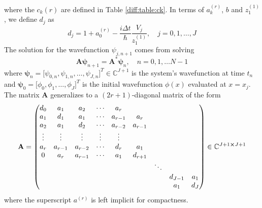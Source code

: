 \documentclass[11pt, a4paper]{article}
\newcommand{\mat}[1]{\mathbf{#1}}
\begin{document}
where the $ c_{k}(r) $ are defined in Table \ref{diff:table:ck}. In terms of $ a_{k}^{(r)} $, $ b $ and $ z_{1}^{(1)} $, we define $ d_{j} $  as
\begin{equation}
	d_{j} = 1 + a_{0}^{(r)} - \frac{i\Delta t}{\hbar}\frac{V_{j}}{z_{1}^{(1)}}, \quad j = 0, 1, \ldots, J \label{diff:eq:d}
\end{equation}
The solution for the wavefunction $ \psi_{j, n+1} $ comes from solving
\begin{equation}
	\mat{A} \bm{\psi}_{n+1} = \mat{A}^{*} \bm{\psi}_{n}, \quad n = 0, 1, \ldots N-1 \label{diff:eq:psi-sys-eq}
\end{equation}
where $ \bm{\psi}_{n} = \big[\psi_{0, n}, \psi_{1, n}, \ldots, \psi_{J, n}\big]^{T} \in \mathbb{C}^{J+1} $ is the system's wavefunction at time $ t_{n} $ and $ \bm{\psi}_{0} = \big[\phi_{0}, \phi_{1}, \ldots, \phi_{J}\big]^{T} $ is the initial wavefunction $ \phi(x) $ evaluated at $ x = x_{j} $. The matrix $ \mat{A} $ generalizes to a $ (2r + 1) $-diagonal matrix of the form
\begin{equation}
	\mat{A} = 
	\begin{pmatrix}
		d_{0} & a_{1} & a_{2} & \cdots & a_{r} & & & & \\
		a_{1} & d_{1} & a_{1} & \cdots & a_{r-1} & a_{r} & & &\\
 		a_{2} & a_{1} & d_{2} & \cdots & a_{r-2} & a_{r-1} & & &\\
 		\vdots & \vdots & \vdots & \vdots & \vdots & & & &\\
 		a_{r} & a_{r-1} & a_{r-2} & \cdots & d_{r} & a_{1} & & &\\
 		0 & a_{r} & a_{r-1} & \cdots & a_{1} & d_{r+1} & & &\\
 		  &       &         &        &       &         & \ddots & &\\
   		& & & & & &  & d_{J-1} & a_{1}\\
   		& & & & & & & a_{1} & d_{J}
	\end{pmatrix}
	\in \mathbb{C}^{J+1 \cross J+1} \label{diff:eq:A}
\end{equation}
where the superscript $ a^{(r)} $ is left implicit for compactness.
\end{document}
